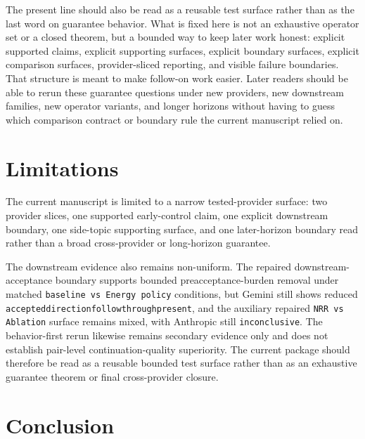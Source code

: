 \documentclass[11pt]{article}
\renewcommand{\_}{\textunderscore\hspace{0pt}}
\begin{document}
The present line should also be read as a reusable test surface rather than as
the last word on guarantee behavior. What is fixed here is not an exhaustive
operator set or a closed theorem, but a bounded way to keep later work honest:
explicit supported claims, explicit supporting surfaces, explicit boundary
surfaces, explicit comparison surfaces, provider-sliced reporting, and visible
failure boundaries. That
structure is meant to make follow-on work easier. Later readers should be able
to rerun these guarantee questions under new providers, new downstream
families, new operator variants, and longer horizons without having to guess
which comparison contract or boundary rule the current manuscript relied on.

\section{Limitations}

The current manuscript is limited to a narrow tested-provider surface: two
provider slices, one supported early-control claim, one explicit downstream
boundary, one side-topic supporting surface, and one later-horizon boundary
read rather than a broad cross-provider or long-horizon guarantee.

The downstream evidence also remains non-uniform. The repaired downstream-
acceptance boundary supports bounded preacceptance-burden removal under matched
\texttt{baseline vs Energy policy} conditions, but Gemini still shows reduced
\texttt{accepted\_direction\_followthrough\_present}, and the auxiliary repaired
\texttt{NRR vs Ablation} surface remains mixed, with Anthropic still
\texttt{inconclusive}. The behavior-first rerun likewise remains secondary
evidence only and does not establish pair-level continuation-quality
superiority. The current package should therefore be read as a reusable bounded
test surface rather than as an exhaustive guarantee theorem or final
cross-provider closure.

\section{Conclusion}
\end{document}
